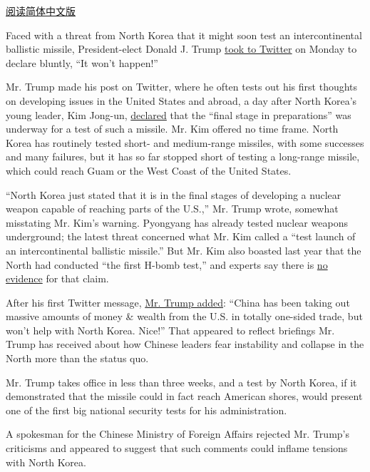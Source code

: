 \href{http://cn.nytimes.com/asia-pacific/20170104/trump-twitter-north-korea-missiles-china/}{阅读简体中文版}

Faced with a threat from North Korea that it might soon test an
intercontinental ballistic missile, President-elect Donald J. Trump
\href{https://twitter.com/realDonaldTrump/status/816057920223846400?lang=en}{took
to Twitter} on Monday to declare bluntly, ``It won't happen!''

Mr. Trump made his post on Twitter, where he often tests out his first
thoughts on developing issues in the United States and abroad, a day
after North Korea's young leader, Kim Jong-un,
\href{https://www.nytimes.com/2017/01/01/world/asia/north-korea-intercontinental-ballistic-missile-test-kim-jong-un.html}{declared}
that the ``final stage in preparations'' was underway for a test of such
a missile. Mr. Kim offered no time frame. North Korea has routinely
tested short- and medium-range missiles, with some successes and many
failures, but it has so far stopped short of testing a long-range
missile, which could reach Guam or the West Coast of the United States.

``North Korea just stated that it is in the final stages of developing a
nuclear weapon capable of reaching parts of the U.S.,'' Mr. Trump wrote,
somewhat misstating Mr. Kim's warning. Pyongyang has already tested
nuclear weapons underground; the latest threat concerned what Mr. Kim
called a ``test launch of an intercontinental ballistic missile.'' But
Mr. Kim also boasted last year that the North had conducted ``the first
H-bomb test,'' and experts say there is
\href{https://www.nytimes.com/2016/01/07/world/asia/north-korea-hydrogen-bomb-q-a.html}{no
evidence} for that claim.

After his first Twitter message,
\href{https://twitter.com/realDonaldTrump/status/816068355555815424}{Mr.
Trump added}: ``China has been taking out massive amounts of money \&
wealth from the U.S. in totally one-sided trade, but won't help with
North Korea. Nice!'' That appeared to reflect briefings Mr. Trump has
received about how Chinese leaders fear instability and collapse in the
North more than the status quo.

Mr. Trump takes office in less than three weeks, and a test by North
Korea, if it demonstrated that the missile could in fact reach American
shores, would present one of the first big national security tests for
his administration.

A spokesman for the Chinese Ministry of Foreign Affairs rejected Mr.
Trump's criticisms and appeared to suggest that such comments could
inflame tensions with North Korea.

